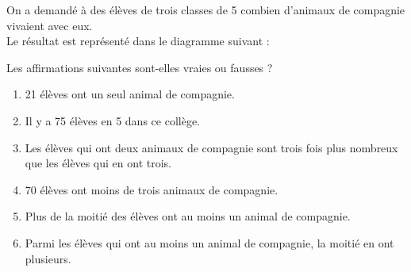 \begin{exercice*}
  On a demandé à des élèves de trois classes de 5 combien d'animaux de compagnie vivaient avec eux. \\
  Le résultat est représenté dans le diagramme suivant :

  \smallskip
  \hspace*{-15mm}
  Les affirmations suivantes sont-elles vraies ou fausses ?
  \begin{enumerate}
     \item 21 élèves ont un seul animal de compagnie.
     \item Il y a 75 élèves en 5 dans ce collège.
     \item Les élèves qui ont deux animaux de compagnie sont trois fois plus nombreux que les élèves qui en ont trois.
     \item 70 élèves ont moins de trois animaux de compagnie.
     \item Plus de la moitié des élèves ont au moins un animal de compagnie.
     \item Parmi les élèves qui ont au moins un animal de compagnie, la moitié en ont plusieurs.
  \end{enumerate}

\end{exercice*}
